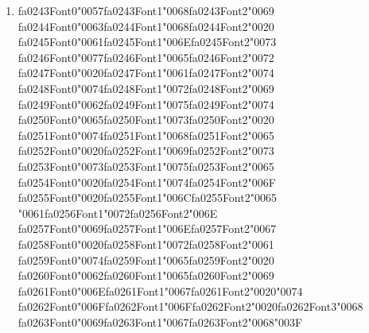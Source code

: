 \documentclass[12pt]{article}
\begin{document}
\begin{enumerate}[label=Q\arabic*.]
 \begin{enumerate}[label=(\Alph*)]
     \item Cross-entropy loss misconfigured
     \item The final layer is using Softmax without temperature scaling
     \item Learning rate too high
     \item All pre-activation values are negative in the first layer
 \end{enumerate}
 
 \item {\csname fa0243Font0\endcsname\char"0057}{\csname fa0243Font1\endcsname\char"0068}{\csname fa0243Font2\endcsname\char"0069} {\csname fa0244Font0\endcsname\char"0063}{\csname fa0244Font1\endcsname\char"0068}{\csname fa0244Font2\endcsname\char"0020} {\csname fa0245Font0\endcsname\char"0061}{\csname fa0245Font1\endcsname\char"006E}{\csname fa0245Font2\endcsname\char"0073} {\csname fa0246Font0\endcsname\char"0077}{\csname fa0246Font1\endcsname\char"0065}{\csname fa0246Font2\endcsname\char"0072} {\csname fa0247Font0\endcsname\char"0020}{\csname fa0247Font1\endcsname\char"0061}{\csname fa0247Font2\endcsname\char"0074} {\csname fa0248Font0\endcsname\char"0074}{\csname fa0248Font1\endcsname\char"0072}{\csname fa0248Font2\endcsname\char"0069} {\csname fa0249Font0\endcsname\char"0062}{\csname fa0249Font1\endcsname\char"0075}{\csname fa0249Font2\endcsname\char"0074} {\csname fa0250Font0\endcsname\char"0065}{\csname fa0250Font1\endcsname\char"0073}{\csname fa0250Font2\endcsname\char"0020} {\csname fa0251Font0\endcsname\char"0074}{\csname fa0251Font1\endcsname\char"0068}{\csname fa0251Font2\endcsname\char"0065} {\csname fa0252Font0\endcsname\char"0020}{\csname fa0252Font1\endcsname\char"0069}{\csname fa0252Font2\endcsname\char"0073} {\csname fa0253Font0\endcsname\char"0073}{\csname fa0253Font1\endcsname\char"0075}{\csname fa0253Font2\endcsname\char"0065} {\csname fa0254Font0\endcsname\char"0020}{\csname fa0254Font1\endcsname\char"0074}{\csname fa0254Font2\endcsname\char"006F} {\csname fa0255Font0\endcsname\char"0020}{\csname fa0255Font1\endcsname\char"006C}{\csname fa0255Font2\endcsname\char"0065} {\char"0061}{\csname fa0256Font1\endcsname\char"0072}{\csname fa0256Font2\endcsname\char"006E} {\csname fa0257Font0\endcsname\char"0069}{\csname fa0257Font1\endcsname\char"006E}{\csname fa0257Font2\endcsname\char"0067} {\csname fa0258Font0\endcsname\char"0020}{\csname fa0258Font1\endcsname\char"0072}{\csname fa0258Font2\endcsname\char"0061} {\csname fa0259Font0\endcsname\char"0074}{\csname fa0259Font1\endcsname\char"0065}{\csname fa0259Font2\endcsname\char"0020} {\csname fa0260Font0\endcsname\char"0062}{\csname fa0260Font1\endcsname\char"0065}{\csname fa0260Font2\endcsname\char"0069} {\csname fa0261Font0\endcsname\char"006E}{\csname fa0261Font1\endcsname\char"0067}{\csname fa0261Font2\endcsname\char"0020}{\char"0074} {\csname fa0262Font0\endcsname\char"006F}{\csname fa0262Font1\endcsname\char"006F}{\csname fa0262Font2\endcsname\char"0020}{\csname fa0262Font3\endcsname\char"0068} {\csname fa0263Font0\endcsname\char"0069}{\csname fa0263Font1\endcsname\char"0067}{\csname fa0263Font2\endcsname\char"0068}{\char"003F}

\end{enumerate}
\end{document}
